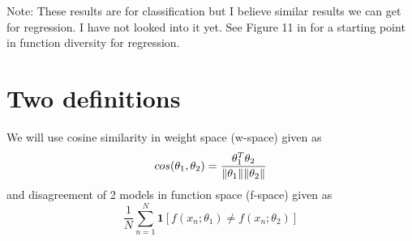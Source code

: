 Note: These results are for classification but I believe similar results we can get for regression. I have not looked into it yet. See Figure 11 in \textcite{wilson2020bayesian} for a starting point in function diversity for regression.

\section{Two definitions}
We will use cosine similarity in weight space (w-space) given as
\begin{equation}
	cos(\theta_1,\theta_2) = \frac{\theta_1^T\theta_2}{\norm{\theta_1}\norm{\theta_2}}
\end{equation}
and disagreement of 2 models in function space (f-space) given as
\begin{equation}
\frac{1}{N}\sum_{n=1}^{N}\boldsymbol{1}[f(x_n;\theta_1)\neq f(x_n;\theta_2)]
\end{equation}

